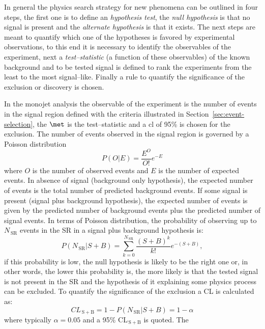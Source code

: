 In general the physics search strategy for new phenomena can be outlined in four
steps, the first one is to define an \emph{hypothesis test}, the \emph{null
  hypothesis} is that no signal is present and the \emph{alternate hypothesis}
is that it exists. The next steps are meant to quantify which one of the
hypotheses is favored by experimental observations, to this end it is necessary
to identify the observables of the experiment, next a \emph{test--statistic} (a
function of these observables) of the known background and to be tested signal
is defined to rank the experiments from the least to the most
signal--like. Finally a rule to quantify the significance of the exclusion or
discovery is chosen.

In the monojet analysis the observable of the experiment is the number of events
in the signal region defined with the criteria illustrated in
Section~\ref{sec:event-selection}, the $\met$ is the test--statistic and a
\gls{cl} of 95\% is chosen for the exclusion. The number of events observed in
the signal region is governed by a Poisson distribution
\begin{equation}
  \label{eq:86}
  P(O|E) = \frac{E^O }{O!} e^{- E}
\end{equation}
where $O$ is the number of observed events and $E$ is the number of expected
events. In absence of signal (background only hypothesis), the expected number
of events is the total number of predicted background events. If some signal is
present (signal plus background hypothesis), the expected number of events is
given by the predicted number of background events plus the predicted number of
signal events. In terms of Poisson distribution, the probability of observing up
to $N_\mathrm{\, SR}$ events in the SR in a signal plus background hypothesis
is:
\begin{equation}
  \label{eq:87}
  P(N_\mathrm{\, SR}|S+B) = \sum^{N_\mathrm{\, SR}}_{k = 0} \frac{(S + B)^k}{k!}
  e^{- (S + B)},
\end{equation}
if this probability is low, the null hypothesis is likely to be the right one
or, in other words, the lower this probability is, the more likely is that the
tested signal is not present in the SR and the hypothesis of it explaining some
physics process can be excluded. To quantify the significance of the exclusion a
CL is calculated as:
\begin{equation}
  \label{eq:88}
  CL_\mathrm{\, S+B} = 1 - P(N_\mathrm{\, SR}|S+B) = 1 - \alpha
\end{equation}
where typically $\alpha = 0.05$ and a 95\% CL$_\mathrm{\, S+B}$ is quoted. The
